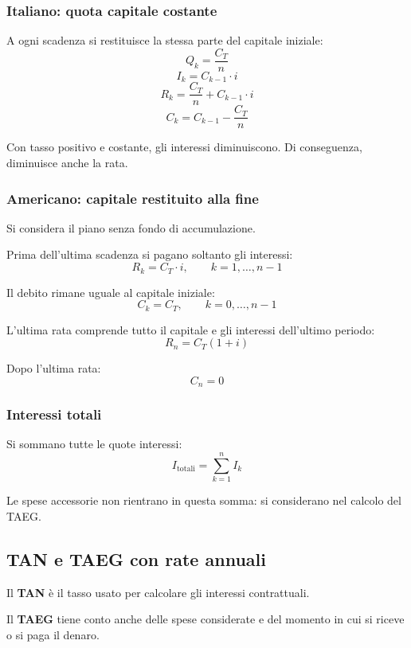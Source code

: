 \subsubsection*{Italiano: quota capitale costante}

\noindent
A ogni scadenza si restituisce la stessa parte
del capitale iniziale:
\[
    Q_k=\frac{C_T}{n}
\]
\[
    I_k=C_{k-1}\cdot i
\]
\[
    R_k=\frac{C_T}{n}+C_{k-1}\cdot i
\]
\[
    C_k=C_{k-1}-\frac{C_T}{n}
\]

\noindent
Con tasso positivo e costante, gli interessi diminuiscono.
Di conseguenza, diminuisce anche la rata.

\subsubsection*{Americano: capitale restituito alla fine}

\noindent
Si considera il piano senza fondo di accumulazione.

\noindent
Prima dell'ultima scadenza si pagano soltanto gli interessi:
\[
    R_k=C_T\cdot i,
    \qquad k=1,\ldots,n-1
\]

\noindent
Il debito rimane uguale al capitale iniziale:
\[
    C_k=C_T,
    \qquad k=0,\ldots,n-1
\]

\noindent
L'ultima rata comprende tutto il capitale
e gli interessi dell'ultimo periodo:
\[
    R_n=C_T(1+i)
\]

\noindent
Dopo l'ultima rata:
\[
    C_n=0
\]

\subsubsection*{Interessi totali}

\noindent
Si sommano tutte le quote interessi:
\[
    I_{\text{totali}}=\sum_{k=1}^{n}I_k
\]

\noindent
Le spese accessorie non rientrano in questa somma:
si considerano nel calcolo del TAEG.

\subsection{TAN e TAEG con rate annuali}

\noindent
Il \textbf{TAN} è il tasso usato per calcolare
gli interessi contrattuali.

\noindent
Il \textbf{TAEG} tiene conto anche delle spese considerate
e del momento in cui si riceve o si paga il denaro.

